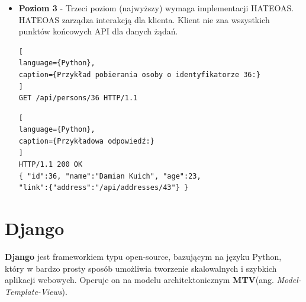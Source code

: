 \documentclass[oneside,polski,logo,indent]{amuthesis}
\begin{document}
\begin{itemize}
Drugi poziom wprowadza też rozszerzenie dla statusów odpowiedzi. Statusy należy wykorzystywać zależnie od sposobu realizacji zapytania.\\

\begin{itemize}
\item 1XX – Kody informacyjne
\item 2XX – Kody powodzenia
\item 3XX – Kody przekierowania
\item 4XX – Kody błędu aplikacji klienta
\item 5XX – Kody błędu serwera
\end{itemize}

\newpage 
\begin{lstlisting}[
language={Python},
caption={Dodawanie np. rzeczy}
]
POST /api/addSomething HTTP/1.1
{ "item_name":"Chair" }
\end{lstlisting}

\begin{lstlisting}[
language={Python},
caption={Odpowiedzi}
]
201 Created
{ "item_id":50 }
# or
409 Conflict
{ "error":"Wrong data input." }
\end{lstlisting}

\item \textbf{Poziom 3} - Trzeci poziom (najwyższy) wymaga implementacji HATEOAS. HATEOAS zarządza interakcją dla klienta. Klient nie zna wszystkich punktów końcowych API dla danych żądań.

\begin{lstlisting}[
language={Python},
caption={Przykład pobierania osoby o identyfikatorze 36:}
]
GET /api/persons/36 HTTP/1.1
\end{lstlisting}

\begin{lstlisting}[
language={Python},
caption={Przykładowa odpowiedź:}
]
HTTP/1.1 200 OK
{ "id":36, "name":"Damian Kuich", "age":23,
"link":{"address":"/api/addresses/43"} }
\end{lstlisting} 

\end{itemize}

\section{Django}
\textbf{Django} jest frameworkiem typu open-source,  bazującym na języku Python, który w bardzo prosty sposób umożliwia tworzenie skalowalnych i szybkich aplikacji webowych. Operuje on na modelu architektonicznym \textbf{MTV}(ang. \emph{Model-Template-Views}). 
\end{document}
